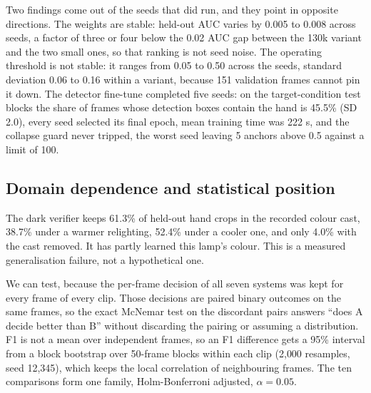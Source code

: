 \documentclass[conference,a4paper]{IEEEtran}
\begin{document}
Two findings come out of the seeds that did run, and they point in opposite
directions. The weights are stable: held-out AUC varies by 0.005 to 0.008
across seeds, a factor of three or four below the 0.02 AUC gap between the
130k variant and the two small ones, so that ranking is not seed noise. The
operating threshold is not stable: it ranges from 0.05 to 0.50 across the
seeds, standard deviation 0.06 to 0.16 within a variant, because 151
validation frames cannot pin it down. The detector fine-tune completed five
seeds: on the target-condition test blocks the share of frames whose
detection boxes contain the hand is 45.5\% (SD 2.0), every seed selected its
final epoch, mean training time was 222 s, and the collapse guard never
tripped, the worst seed leaving 5 anchors above 0.5 against a limit of 100.

\subsection{Domain dependence and statistical position}
\label{sec:stats}
The dark verifier keeps 61.3\% of held-out hand crops in the recorded
colour cast, 38.7\% under a warmer relighting, 52.4\% under a cooler one,
and only 4.0\% with the cast removed. It has partly learned this lamp's
colour. This is a measured generalisation failure, not a hypothetical one.

We can test, because the per-frame decision of all seven systems was kept
for every frame of every clip. Those decisions are paired binary outcomes on
the same frames, so the exact McNemar test on the discordant pairs answers
``does A decide better than B'' without discarding the pairing or assuming a
distribution. F1 is not a mean over independent frames, so an F1 difference
gets a 95\% interval from a block bootstrap over 50-frame blocks within each
clip (2{,}000 resamples, seed 12{,}345), which keeps the local correlation
of neighbouring frames. The ten comparisons form one family,
Holm-Bonferroni adjusted, $\alpha=0.05$.
\end{document}
